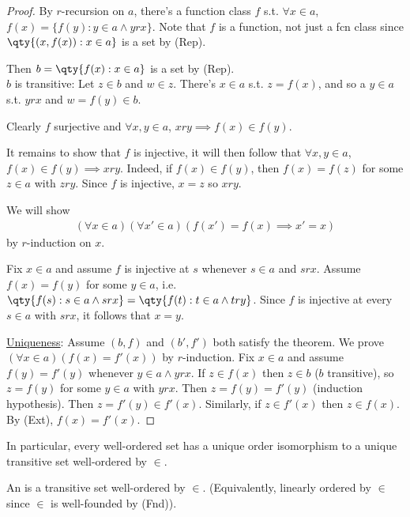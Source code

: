 \begin{proof}
    By $r$-recursion on $a$, there's a function class $f$ s.t. $\forall x \in a$, $f(x) = \{f(y) : y \in a \wedge y r x \}$.
    Note that $f$ is a function, not just a fcn class since $\qty{(x, f(x)) : x \in a}$ is a set by (Rep).

    Then $b = \qty{f(x) : x \in a}$ is a set by (Rep). \\
    $b$ is transitive: Let $z \in b$ and $w \in z$.
    There's $x \in a$ s.t. $z = f(x)$, and so a $y \in a$ s.t. $y r x$ and $w = f(y) \in b$.

    Clearly $f$ surjective and $\forall x, y \in a$, $xry \implies f(x) \in f(y)$.

    It remains to show that $f$ is injective, it will then follow that $\forall x, y \in a$, $f(x) \in f(y) \implies x r y$.
    Indeed, if $f(x) \in f(y)$, then $f(x) = f(z)$ for some $z \in a$ with $z r y$.
    Since $f$ is injective, $x = z$ so $x r y$.

    We will show
    \begin{align*}
        (\forall x \in a)(\forall x' \in a)(f(x') = f(x) \implies x' = x)
    \end{align*}
    by $r$-induction on $x$.

    Fix $x \in a$ and assume $f$ is injective at $s$ whenever $s \in a$ and $srx$.
    Assume $f(x) = f(y)$ for some $y \in a$, i.e. $\qty{f(s): s \in a \wedge s r x} = \qty{f(t) : t \in a \wedge try}$.
    Since $f$ is injective at every $s \in a$ with $srx$, it follows that $x = y$.

    \underline{Uniqueness}: Assume $(b, f)$ and $(b', f')$ both satisfy the theorem.
    We prove $(\forall x \in a)(f(x) = f'(x))$ by $r$-induction.
    Fix $x \in a$ and assume $f(y) = f'(y)$ whenever $y \in a \wedge y r x$.
    If $z \in f(x)$ then $z \in b$ ($b$ transitive), so $z = f(y)$ for some $y \in a$ with $y r x$.
    Then $z = f(y) = f'(y)$ (induction hypothesis).
    Then $z = f'(y) \in f'(x)$.
    Similarly, if $z \in f'(x)$ then $z \in f(x)$.
    By (Ext), $f(x) = f'(x)$.
\end{proof}

In particular, every well-ordered set has a unique order isomorphism to a unique transitive set well-ordered by $\in$.

\begin{definition}[Ordinal]
    An  is a transitive set well-ordered by $\in$. (Equivalently, linearly ordered by $\in$ since $\in$ is well-founded by (Fnd)).
\end{definition}

